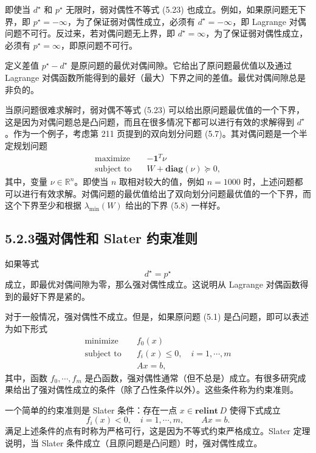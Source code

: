 \documentclass[UTF8,12pt,a4paper,fontset=fandol]{ctexart}
\begin{document}
即使当 $d^\star$ 和 $p^\star$ 无限时，弱对偶性不等式 (5.23) 也成立。例如，如果原问题无下界，即 $p^\star=-\infty$，为了保证弱对偶性成立，必须有 $d^\star=-\infty$，即 Lagrange 对偶问题不可行。反过来，若对偶问题无上界，即 $d^\star=\infty$，为了保证弱对偶性成立，必须有 $p^\star=\infty$，即原问题不可行。

定义差值 $p^\star-d^\star$ 是原问题的最优对偶间隙。它给出了原问题最优值以及通过 Lagrange 对偶函数所能得到的最好（最大）下界之间的差值。最优对偶间隙总是非负的。

当原问题很难求解时，弱对偶不等式 (5.23) 可以给出原问题最优值的一个下界，这是因为对偶问题总是凸问题，而且在很多情况下都可以进行有效的求解得到 $d^\star$。作为一个例子，考虑第 211 页提到的双向划分问题 (5.7)。其对偶问题是一个半定规划问题
\[
\begin{aligned}
\text{maximize}\quad & -\mathbf{1}^T\nu\\
\text{subject to}\quad & W+\mathbf{diag}(\nu)\succeq 0,
\end{aligned}
\]
其中，变量 $\nu\in\mathbb{R}^n$。即使当 $n$ 取相对较大的值，例如 $n=1000$ 时，上述问题都可以进行有效求解。对偶问题的最优值给出了双向划分问题最优值的一个下界，而这个下界至少和根据 $\lambda_{\min}(W)$ 给出的下界 (5.8) 一样好。

\subsection*{5.2.3\quad 强对偶性和 Slater 约束准则}

如果等式
\begin{equation}
d^\star=p^\star
\tag{5.24}
\end{equation}
成立，即最优对偶间隙为零，那么强对偶性成立。这说明从 Lagrange 对偶函数得到的最好下界是紧的。

对于一般情况，强对偶性不成立。但是，如果原问题 (5.1) 是凸问题，即可以表述为如下形式
\begin{equation}
\begin{aligned}
\text{minimize}\quad & f_0(x)\\
\text{subject to}\quad & f_i(x)\leq 0,\quad i=1,\cdots,m\\
& Ax=b,
\end{aligned}
\tag{5.25}
\end{equation}
其中，函数 $f_0,\cdots,f_m$ 是凸函数，强对偶性通常（但不总是）成立。有很多研究成果给出了强对偶性成立的条件（除了凸性条件以外）。这些条件称为约束准则。

一个简单的约束准则是 Slater 条件：存在一点 $x\in\mathbf{relint}\,D$ 使得下式成立
\begin{equation}
f_i(x)<0,\quad i=1,\cdots,m,\qquad Ax=b.
\tag{5.26}
\end{equation}
满足上述条件的点有时称为严格可行，这是因为不等式约束严格成立。Slater 定理说明，当 Slater 条件成立（且原问题是凸问题）时，强对偶性成立。
\end{document}
